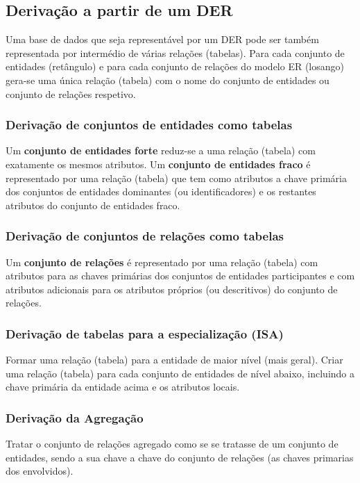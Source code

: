 \documentclass{article}
\begin{document}
\subsection{Derivação a partir de um DER}
Uma base de dados que seja representável por um DER pode ser também representada por intermédio de várias relações (tabelas). Para cada conjunto de entidades (retângulo) e para cada conjunto de relações do modelo ER (losango) gera-se uma única relação (tabela) com o nome do conjunto de entidades ou conjunto de relações respetivo.

\subsubsection*{Derivação de conjuntos de entidades como tabelas}
Um \textbf{conjunto de entidades forte} reduz-se a uma relação (tabela) com exatamente os mesmos atributos. Um \textbf{conjunto de entidades fraco} é representado por uma relação (tabela) que tem como atributos a chave primária dos conjuntos de entidades dominantes (ou identificadores) e os restantes atributos do conjunto de entidades fraco.

\subsubsection*{Derivação de conjuntos de relações como tabelas}
Um \textbf{conjunto de relações} é representado por uma relação (tabela) com atributos para as chaves primárias dos conjuntos de entidades participantes e com atributos adicionais para os atributos próprios (ou descritivos) do conjunto de relações.

\subsubsection*{Derivação de tabelas para a especialização (ISA)}
Formar uma relação (tabela) para a entidade de maior nível (mais geral). Criar uma relação (tabela) para cada conjunto de entidades de nível abaixo, incluindo a chave primária da entidade acima e os atributos locais.

\subsubsection*{Derivação da Agregação}
Tratar o conjunto de relações agregado como se se tratasse de um conjunto de entidades, sendo a sua chave a chave do conjunto de relações (as chaves primarias dos envolvidos).
\end{document}
